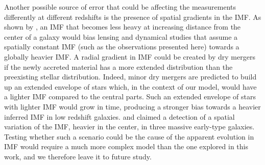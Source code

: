 \documentclass[usenatbib, letters]{mnras}
\def\aimf{\alpha_{\mathrm{IMF}}}
\def\Fref#1{Figure~\ref{#1}\xspace}
\begin{document}
Another possible source of error that could be affecting the measurements differently at different redshifts is the presence of spatial gradients in the IMF.
As shown by \citet{New++15}, an IMF that becomes less heavy at increasing distance from the center of a galaxy would bias lensing and dynamical studies that assume a spatially constant IMF (such as the observations presented here) towards a globally heavier IMF. A radial gradient in IMF could be created by dry mergers if the newly accreted material has a more extended distribution than the preexisting stellar distribution. Indeed, minor dry mergers are predicted to build up an extended envelope of stars \citep{Hop++10} which, in the context of our model, would have a lighter IMF compared to the central parts. Such an extended envelope of stars with lighter IMF would grow in time, producing a stronger bias towards a heavier inferred IMF in low redshift galaxies. \citet{Mar++15} and \citet{LaB++16} claimed a detection of a spatial variation of the IMF, heavier in the center, in three massive early-type galaxies. 
Testing whether such a scenario could be the cause of the apparent evolution in IMF would require a much more complex model than the one explored in this work, and we therefore leave it to future study.

\end{document}
